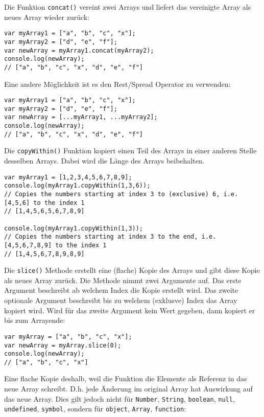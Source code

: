 \documentclass[babel]{book}
\begin{document}
Die Funktion \lstinline|concat()| vereint zwei Arrays und liefert das vereinigte Array als neues Array wieder zurück:
\begin{lstlisting}[caption=Array Konstruktor]
var myArray1 = ["a", "b", "c", "x"];
var myArray2 = ["d", "e", "f"];
var newArray = myArray1.concat(myArray2);
console.log(newArray);
// ["a", "b", "c", "x", "d", "e", "f"]
\end{lstlisting}

Eine andere Möglichkeit ist es den Rest/Spread Operator zu verwenden:
\begin{lstlisting}[caption=Array Konstruktor]
var myArray1 = ["a", "b", "c", "x"];
var myArray2 = ["d", "e", "f"];
var newArray = [...myArray1, ...myArray2];
console.log(newArray);
// ["a", "b", "c", "x", "d", "e", "f"]
\end{lstlisting}

Die \lstinline|copyWithin()| Funktion kopiert einen Teil des Arrays in einer anderen Stelle desselben Arrays. Dabei wird die Länge des Arrays beibehalten. 

\begin{lstlisting}[caption=Array Konstruktor]
var myArray1 = [1,2,3,4,5,6,7,8,9];
console.log(myArray1.copyWithin(1,3,6));
// Copies the numbers starting at index 3 to (exclusive) 6, i.e. [4,5,6] to the index 1
// [1,4,5,6,5,6,7,8,9]

console.log(myArray1.copyWithin(1,3));
// Copies the numbers starting at index 3 to the end, i.e. [4,5,6,7,8,9] to the index 1
// [1,4,5,6,7,8,9,8,9]
\end{lstlisting}

Die \lstinline|slice()| Methode erstellt eine (flache) Kopie des Arrays und gibt diese Kopie als neues Array zurück. Die Methode nimmt zwei Argumente auf. Das erste Argument beschreibt ab welchem Index die Kopie erstellt wird. Das zweite optionale Argument beschreibt bis zu welchem (exklusve) Index das Array kopiert wird. Wird für das zweite Argument kein Wert gegeben, dann kopiert er bis zum Arrayende:

\begin{lstlisting}[caption=Array Konstruktor]
var myArray = ["a", "b", "c", "x"];
var newArray = myArray.slice(0);
console.log(newArray);
// ["a", "b", "c", "x"]
\end{lstlisting}

Eine flache Kopie deshalb, weil die Funktion die Elemente als Referenz in das neue Array schreibt. D.h. jede Änderung im original Array hat Auswirkung auf das neue Array. Dies gilt jedoch nicht für \lstinline|Number|, \lstinline|String|, \lstinline|boolean|, \lstinline|null|, \lstinline|undefined|, \lstinline|symbol|, sondern für \lstinline|object|, \lstinline|Array|, \lstinline|function|:
\end{document}
